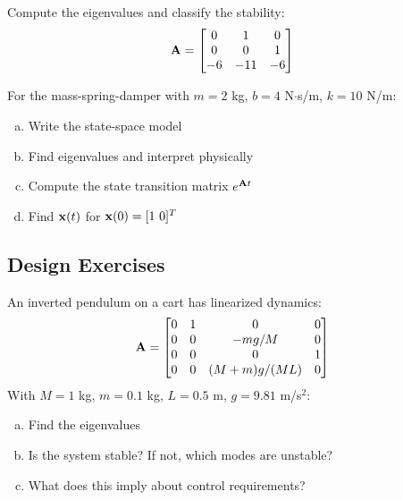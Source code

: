 \begin{exercise}
Compute the eigenvalues and classify the stability:
\begin{equation*}
    \mathbf{A} = \begin{bmatrix} 0 & 1 & 0 \\ 0 & 0 & 1 \\ -6 & -11 & -6 \end{bmatrix}
\end{equation*}
\end{exercise}

\begin{exercise}
For the mass-spring-damper with $m = 2$ kg, $b = 4$ N$\cdot$s/m, $k = 10$ N/m:
\begin{enumerate}[(a)]
    \item Write the state-space model
    \item Find eigenvalues and interpret physically
    \item Compute the state transition matrix $e^{\mathbf{A}t}$
    \item Find $\mathbf{x}(t)$ for $\mathbf{x}(0) = [1\ 0]^T$
\end{enumerate}
\end{exercise}

\subsection*{Design Exercises}

\begin{exercise}
An inverted pendulum on a cart has linearized dynamics:
\begin{equation*}
    \mathbf{A} = \begin{bmatrix} 0 & 1 & 0 & 0 \\ 0 & 0 & -mg/M & 0 \\ 0 & 0 & 0 & 1 \\ 0 & 0 & (M+m)g/(ML) & 0 \end{bmatrix}
\end{equation*}
With $M = 1$ kg, $m = 0.1$ kg, $L = 0.5$ m, $g = 9.81$ m/s$^2$:
\begin{enumerate}[(a)]
    \item Find the eigenvalues
    \item Is the system stable? If not, which modes are unstable?
    \item What does this imply about control requirements?
\end{enumerate}
\end{exercise}

